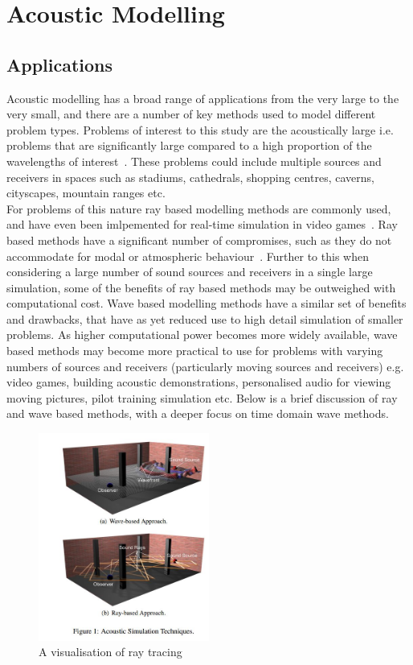 \documentclass{svproc}
\begin{document}

\section{Acoustic Modelling}
\subsection{Applications}
Acoustic modelling has a broad range of applications from the very large to the very small, and there are a number of key methods used to model different problem types. Problems of interest to this study are the acoustically large i.e. problems that are significantly large compared to a high proportion of the wavelengths of interest~\cite{Everest2009}. These problems could include multiple sources and receivers in spaces such as stadiums, cathedrals, shopping centres, caverns, cityscapes, mountain ranges etc.\\ For problems of this nature ray based modelling methods are commonly used, and have even been imlpemented for real-time simulation in video games~\cite{Bengtsson2009}. Ray based methods have a significant number of compromises, such as they do not accommodate for modal or atmospheric behaviour~\cite{Elorza2005}. Further to this when considering a large number of sound sources and receivers in a single large simulation, some of the benefits of ray based methods may be outweighed with computational cost. Wave based modelling methods have a similar set of benefits and drawbacks, that have as yet reduced use to high detail simulation of smaller problems. As higher computational power becomes more widely available, wave based methods may become more practical to use for problems with varying numbers of sources and receivers (particularly moving sources and receivers) e.g. video games, building acoustic demonstrations, personalised audio for viewing moving pictures, pilot training simulation etc. Below is a brief discussion of ray and wave based methods, with a deeper focus on time domain wave methods.
\begin{figure}
\centering
\includegraphics[width=0.5\textwidth]{simulationtechniques.jpg}
\centering
\caption{A visualisation of ray tracing~\cite{Rober2007}}
\end{figure} 
\end{document}
